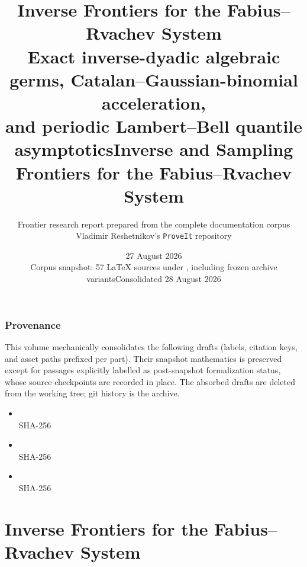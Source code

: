 \documentclass[11pt,oneside]{article}
\title{\bfseries Inverse Frontiers for the Fabius--Rvachev System\\[0.4em]
\large Exact inverse-dyadic algebraic germs, Catalan--Gaussian-binomial acceleration,\\
and periodic Lambert--Bell quantile asymptotics}
\author{Frontier research report prepared from the complete documentation corpus\\
\small Vladimir Reshetnikov's \texttt{ProveIt} repository}
\date{27 August 2026\\
\small Corpus snapshot: 57 LaTeX sources under \repo{}, including frozen archive variants}
\title{\bfseries Inverse and Sampling Frontiers for the Fabius--Rvachev System}
\author{}
\date{Consolidated 28 August 2026}
\numberwithin{equation}{section}
\theoremstyle{definition}
\theoremstyle{remark}
\begin{document}
\maketitle
\tableofcontents
\clearpage
\section*{Provenance}
This volume mechanically consolidates the following drafts (labels, citation
keys, and asset paths prefixed per part).  Their snapshot mathematics is
preserved except for passages explicitly labelled as post-snapshot
formalization status, whose source checkpoints are recorded in place.
The absorbed drafts are deleted from the working tree; git history is the archive.
\begin{itemize}
\item {} \\ {\footnotesize SHA-256 }
\item {} \\ {\footnotesize SHA-256 }
\item {} \\ {\footnotesize SHA-256 }
\end{itemize}
\clearpage
\part{Inverse Frontiers for the Fabius--Rvachev System}
\end{document}
